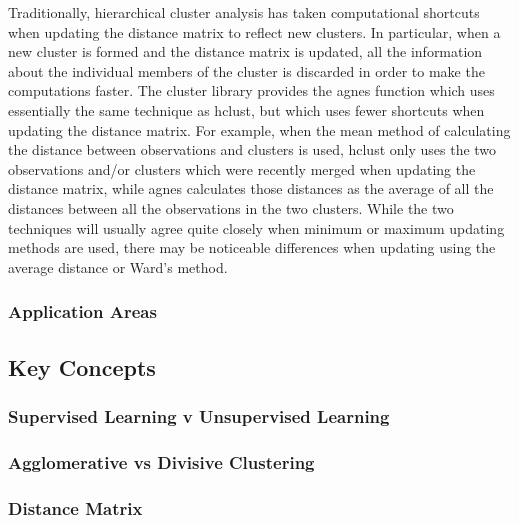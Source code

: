 Traditionally, hierarchical cluster analysis has taken computational shortcuts when updating the distance matrix to reflect new clusters. In particular, when a new cluster is formed and the distance matrix is updated, all the information about the individual members of the cluster is discarded in order to make the computations faster. The cluster library provides the agnes function which uses essentially the same technique as hclust, but which uses fewer shortcuts when updating the distance matrix. For example, when the mean method of calculating the distance between observations and clusters is used, hclust only uses the two observations and/or clusters which were recently merged when updating the distance matrix, while agnes calculates those distances as the average of all the distances between all the observations in the two clusters. While the two techniques will usually agree quite closely when minimum or maximum updating methods are used, there may be noticeable differences when updating using the average distance or Ward's method.

\subsubsection{Application Areas}

\newpage
\subsection{Key Concepts}


\subsubsection{Supervised Learning v Unsupervised Learning}

\subsubsection{Agglomerative vs Divisive Clustering}
\subsubsection{Distance Matrix}


